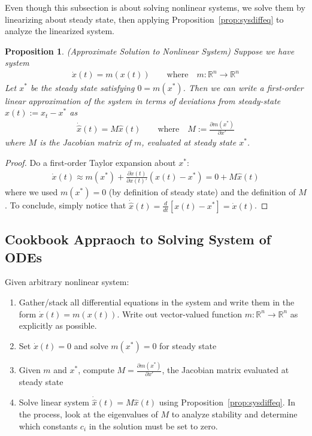 \documentclass[12pt]{article}
\numberwithin{equation}{section} %
\theoremstyle{plain}
\newtheorem{prop}[thm]{Proposition}
\theoremstyle{definition}
\theoremstyle{remark}
\newcommand{\ra}{\rightarrow}
\newcommand{\dx}{\dot{x}}
\newcommand{\Rn}{\mathbb{R}^n}
\begin{document}
Even though this subsection is about solving nonlinear systems, we solve
them by linearizing about steady state, then applying
Proposition~\ref{prop:sysdiffeq} to analyze the linearized system.

\begin{prop}\emph{(Approximate Solution to Nonlinear System)}
Suppose we have system
\begin{align*}
  \dx(t) = m(x(t))
  \qquad\text{where} \quad
  m:\Rn\ra\Rn
\end{align*}
Let $x^*$ be the steady state satisfying $0=m(x^*)$.
Then we can write a first-order linear approximation of the system in
terms of deviations from steady-state $\hat{x}(t):=x_t-x^*$ as
\begin{align*}
  \dot{\hat{x}}(t) = M\hat{x}(t)
  \qquad\text{where}\quad
  M:= \frac{\partial m(x^*)}{\partial x'}
\end{align*}
where $M$ is the Jacobian matrix of $m$, evaluated at steady state
$x^*$.
\end{prop}
\begin{proof}
Do a first-order Taylor expansion about $x^*$:
\begin{align*}
  \dx(t)\approx
  m(x^*)
  +
  \frac{\partial \dx(t)}{\partial x(t)'}
  (x(t)-x^*)
  =
  0 + M\hat{x}(t)
\end{align*}
where we used $m(x^*)=0$ (by definition of steady state)
and the definition of $M$. To conclude, simply notice that
$\dot{\hat{x}}(t)=\frac{d}{dt}[x(t)-x^*]=\dot{x}(t)$.
\end{proof}

\subsection{Cookbook Appraoch to Solving System of ODEs}

Given arbitrary nonlinear system:
\begin{enumerate}[label=(\roman*)]
  \item Gather/stack all differential equations in the system and write
    them in the form $\dx(t)=m(x(t))$.
    Write out vector-valued function $m:\Rn\ra\Rn$ as explicitly as
    possible.
  \item Set $\dx(t)=0$ and solve $m(x^*)=0$ for steady state
  \item Given $m$ and $x^*$, compute $M=\frac{\partial m(x^*)}{\partial
    x'}$, the Jacobian matrix evaluated at steady state
  \item Solve linear system $\dot{\hat{x}}(t)=M\hat{x}(t)$
    using Proposition~\ref{prop:sysdiffeq}.
    In the process, look at the eigenvalues of $M$ to analyze stability
    and determine which constants $c_i$ in the solution must be set to
    zero.
\end{enumerate}
\end{document}
